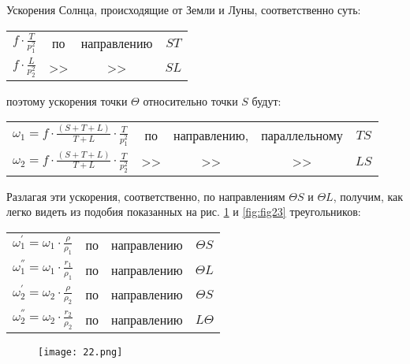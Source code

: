 \documentclass[a4paper,12pt]{article}
\begin{document}
    Ускорения Солнца, происходящие от Земли и Луны, соответственно суть:
    \begin{center}
        \begin{tabular}{cccc}
            $\displaystyle f \cdot \frac{T}{p_1^2}$ & по  & направлению & $ST$ \\[2ex]
            $\displaystyle f \cdot \frac{L}{p_2^2}$ & >>  & >>          & $SL$ \\
        \end{tabular}
    \end{center}
    поэтому ускорения точки $\Theta$ относительно точки $S$ будут:
    \begin{center}
        \begin{tabular}{ccccc}
            $\displaystyle \omega_1=f \cdot \frac{\left(S + T + L \right)}{T + L} \cdot \frac{T}{p_1^2}$ & по & направлению, & параллельному & $TS$ \\[2ex]
            $\displaystyle \omega_2=f \cdot \frac{\left(S + T + L \right)}{T + L} \cdot \frac{T}{p_2^2}$ & >> & >> & >> & $LS$ \\
        \end{tabular}
    \end{center}

    Разлагая эти ускорения, соответственно, по направлениям $\Theta S$ и $\Theta L$, получим, как легко видеть из подобия показанных на рис. \ref{fig:fig22} и \ref{fig:fig23} треугольников:
    \begin{center}
        \begin{tabular}{cccc}
            $\displaystyle \omega_1^{'} = \omega_1 \cdot \frac{\rho}{\rho_1} $ & по  & направлению & $\Theta S$ \\[2ex]
            $\displaystyle \omega_1^{''} = \omega_1 \cdot \frac{r_1}{\rho_1} $ & по  & направлению & $\Theta L$ \\[2ex]
            $\displaystyle \omega_2^{'} = \omega_2 \cdot \frac{\rho}{\rho_2} $ & по  & направлению & $\Theta S$ \\[2ex]
            $\displaystyle \omega_2^{''} = \omega_2 \cdot \frac{r_2}{\rho_2} $ & по  & направлению & $L \Theta$ \\
        \end{tabular}
    \end{center}
    \begin{figure}[h]
        \centering
        \texttt{[image: 22.png]}
        \caption{}\label{fig:fig22}
    \end{figure}
\end{document}
